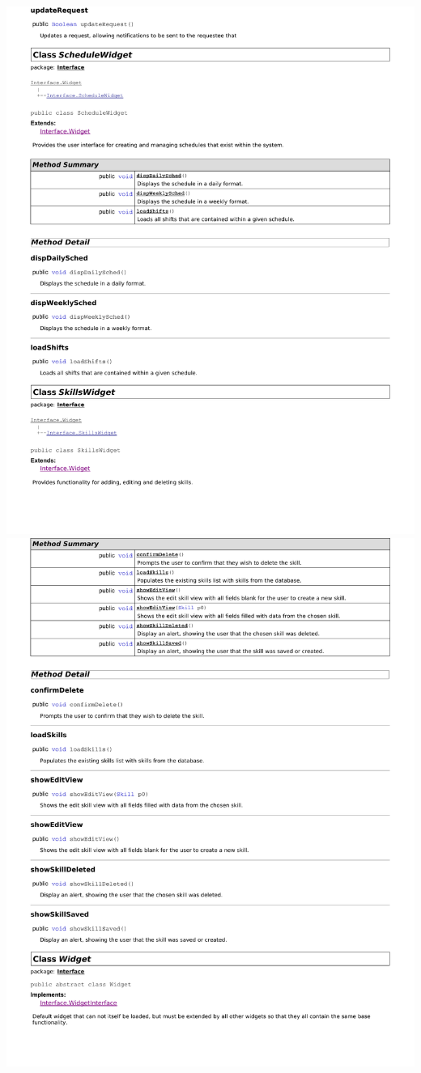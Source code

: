 \documentclass[letterpaper,12pt]{report}
\begin{document}
\newpage
\includegraphics[scale=0.9,trim=20mm 30mm 25mm 25mm]{externals/di10.pdf}
\newpage
\includegraphics[scale=0.9,trim=20mm 30mm 25mm 25mm]{externals/di11.pdf}
\end{document}
